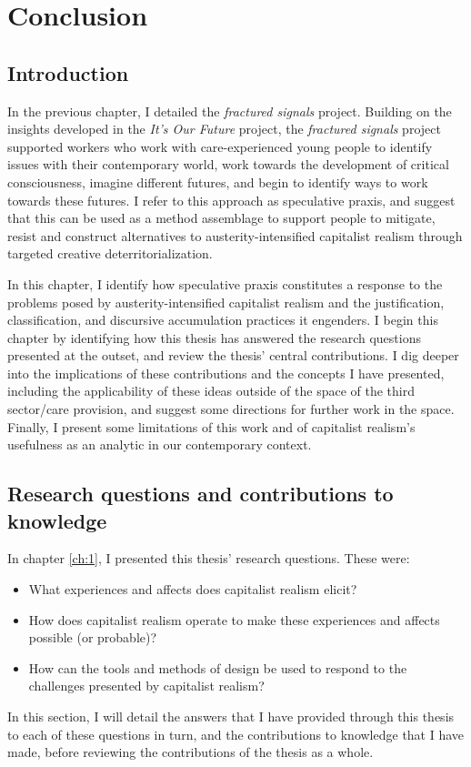 \chapter{Conclusion}
\label{ch:9}

\section{Introduction}
\label{sec:}
In the previous chapter, I detailed the \textit{fractured signals} project. Building on the insights developed in the \emph{It's Our Future} project, the \emph{fractured signals} project supported workers who work with care-experienced young people to identify issues with their contemporary world, work towards the development of critical consciousness, imagine different futures, and begin to identify ways to work towards these futures. I refer to this approach as speculative praxis, and suggest that this can be used as a method assemblage to support people to mitigate, resist and construct alternatives to austerity-intensified capitalist realism through targeted creative deterritorialization. 

In this chapter, I identify how speculative praxis constitutes a response to the problems posed by austerity-intensified capitalist realism and the justification, classification, and discursive accumulation practices it engenders. I begin this chapter by identifying how this thesis has answered the research questions presented at the outset, and review the thesis' central contributions. I dig deeper into the implications of these contributions and the concepts I have presented, including the applicability of these ideas outside of the space of the third sector/care provision, and suggest some directions for further work in the space. Finally, I present some limitations of this work and of capitalist realism's usefulness as an analytic in our contemporary context.

\section{Research questions and contributions to knowledge}
In chapter \ref{ch:1}, I presented this thesis' research questions. These were:
\begin{itemize}
    \item What experiences and affects does capitalist realism elicit?
    \item How does capitalist realism operate to make these experiences and affects possible (or probable)?
    \item How can the tools and methods of design be used to respond to the challenges presented by capitalist realism?
\end{itemize}
In this section, I will detail the answers that I have provided through this thesis to each of these questions in turn, and the contributions to knowledge that I have made, before reviewing the contributions of the thesis as a whole.

